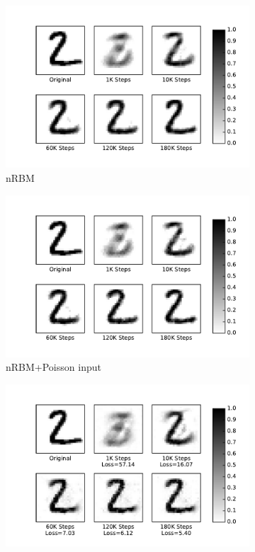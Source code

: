 \begin{figure}
	\centering
	\begin{subfigure}[t]{0.32\textwidth}
		\includegraphics[width=\textwidth]{pics_sdlm/32_MNIST_RBM/recon_digit.pdf}
		\caption{nRBM}
	\end{subfigure}
	\begin{subfigure}[t]{0.32\textwidth}
		\includegraphics[width=\textwidth]{pics_sdlm/33_MNIST_RBM_noise/recon_digit.pdf}
		\caption{nRBM+Poisson input}
	\end{subfigure}
	\begin{subfigure}[t]{0.32\textwidth}
		\includegraphics[width=\textwidth]{pics_sdlm/50_MNIST_SRBM_original/recon_digit.pdf}

\end{subfigure}
\end{figure}
